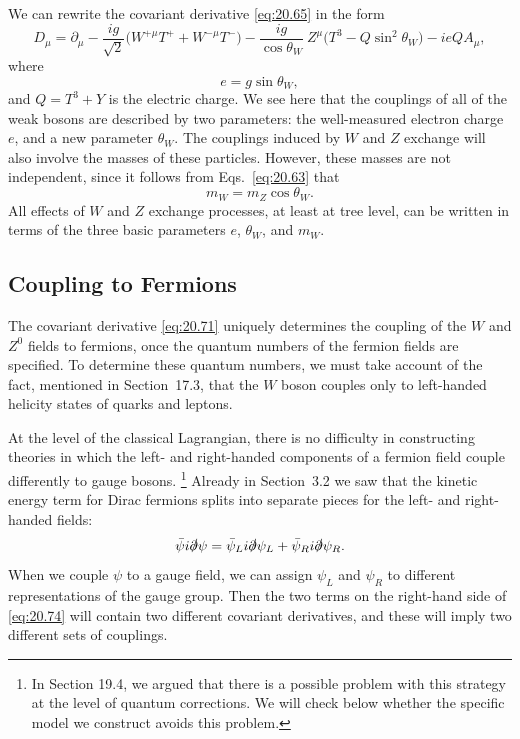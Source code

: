 We can rewrite the covariant derivative \eqref{eq:20.65} in the form
\begin{equation}
  D_\mu = \partial_\mu - \frac{ig}{\sqrt{2}}\bigl( W^{+\mu}T^+ + W^{-\mu}T^-
    \bigr) - \frac{ig}{\cos\theta_W}\ Z^\mu\bigl( T^3 - Q\sin^2\theta_W
      \bigr) - ieQA_\mu ,
  \label{eq:20.71}
\end{equation}
where
\begin{equation}
  e = g\sin\theta_W ,
  \label{eq:20.72}
\end{equation}
and $Q = T^3 + Y$ is the electric charge.  We see here that the couplings of
all of the weak bosons are described by two parameters: the well-measured
electron charge $e$, and a new parameter $\theta_W$.  The couplings induced by
$W$ and $Z$ exchange will also involve the masses of these particles.  However,
these masses are not independent, since it follows from Eqs.~\eqref{eq:20.63}
that
\begin{equation}
  m_W = m_Z\cos\theta_W .
  \label{eq:20.73b}
\end{equation}
All effects of $W$ and $Z$ exchange processes, at least at tree level, can be
written in terms of the three basic parameters $e$, $\theta_W$, and $m_W$.

\subsection{Coupling to Fermions}

The covariant derivative \eqref{eq:20.71} uniquely determines the coupling of
the $W$ and $Z^0$ fields to fermions, once the quantum numbers of the fermion
fields are specified.  To determine these quantum numbers, we must take
account of the fact, mentioned in Section~17.3, that the $W$ boson couples
only to left-handed helicity states of quarks and leptons.

At the level of the classical Lagrangian, there is no difficulty in
constructing theories in which the left- and right-handed components of a
fermion field couple differently to gauge bosons.%
\footnote{In Section 19.4, we argued that there is a possible problem with
this strategy at the level of quantum corrections.  We will check below
whether the specific model we construct avoids this problem.}  Already in
Section~3.2 we saw that the kinetic energy term for Dirac fermions splits
into separate pieces for the left- and right-handed fields:
\begin{equation}
  \bar{\psi}i\slashed{\partial}\psi = \bar{\psi}_L i\slashed{\partial}\psi_L
    + \bar{\psi}_R i\slashed{\partial}\psi_R .
  \label{eq:20.74}
\end{equation}
When we couple $\psi$ to a gauge field, we can assign $\psi_L$ and $\psi_R$ to
different representations of the gauge group.  Then the two terms on the
right-hand side of \eqref{eq:20.74} will contain two different covariant
derivatives, and these will imply two different sets of couplings.

